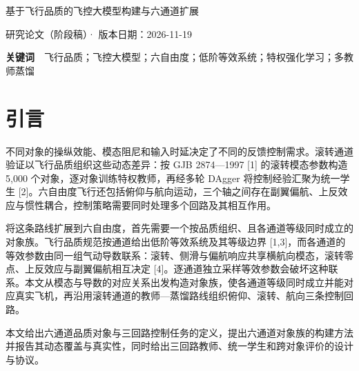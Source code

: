 \documentclass[UTF8,a4paper,11pt,fontset=fandol,scheme=plain]{ctexart}
\begin{document}
{\centering\LARGE\heiti 基于飞行品质的飞控大模型构建与六通道扩展\par}
\vspace{6pt}
{\centering\small 研究论文（阶段稿）· 版本日期：2026-11-19\par}
\vspace{8pt}
\begin{abstract}\noindent \textbf{摘要　}将飞行品质的统一动态描述转化为可跨对象复用的控制知识，是飞控大模型的关键任务。滚转通道验证已形成从品质对象族、特权强化学习教师到统一控制策略的构建链。本文将这一路线扩展到六自由度：以 GJB 2874—1997 的俯仰、滚转与航向等效系统构造六通道品质对象，按俯仰杆、横向杆与脚蹬三条控制回路组织教师训练与多教师蒸馏。六通道对象族以模态按品质等级采样、耦合形状取自 NASA CR-2144 真实飞机数据、导数由模态精确反解的方式构造，按 14 项判据的最差项定级，共 5,000 个对象：1、2、3 级各 1,500 个，分布外 500 个。65,536 个候选中 75.6\% 的导数落在真实飞机范围内；推导得到的滚转零点比 \(\omega_\phi/\omega_d\) 的 5–95 百分位为 0.73–1.10，与真实飞机的 0.64–1.13 一致；1 级对象的全部判据均为 1 级，而滚转对象库逐通道补齐后仅 9\% 的 1 级对象保持 1 级。本文同时给出三回路控制任务、特权教师、统一学生与跨对象评价的设计，后续在该对象族上开展。\end{abstract}
\noindent \textbf{关键词}　飞行品质；飞控大模型；六自由度；低阶等效系统；特权强化学习；多教师蒸馏
\vspace{10pt}

\section{引言}
\label{sec:intro}
不同对象的操纵效能、模态阻尼和输入时延决定了不同的反馈控制需求。滚转通道验证以飞行品质组织这些动态差异：按 GJB 2874—1997 [1] 的滚转模态参数构造 5,000 个对象，逐对象训练特权教师，再经多轮 DAgger 将控制经验汇聚为统一学生 [2]。六自由度飞行还包括俯仰与航向运动，三个轴之间存在副翼偏航、上反效应与惯性耦合，控制策略需要同时处理多个回路及其相互作用。

将这条路线扩展到六自由度，首先需要一个按品质组织、且各通道等级同时成立的对象族。飞行品质规范按通道给出低阶等效系统及其等级边界 [1,3]，而各通道的等效参数由同一组气动导数联系：滚转、侧滑与偏航响应共享横航向模态，滚转零点、上反效应与副翼偏航相互决定 [4]。逐通道独立采样等效参数会破坏这种联系。本文从模态与导数的对应关系出发构造对象族，使各通道等级同时成立并能对应真实飞机，再沿用滚转通道的教师—蒸馏路线组织俯仰、滚转、航向三条控制回路。

本文给出六通道品质对象与三回路控制任务的定义，提出六通道对象族的构建方法并报告其动态覆盖与真实性，同时给出三回路教师、统一学生和跨对象评价的设计与协议。
\end{document}
